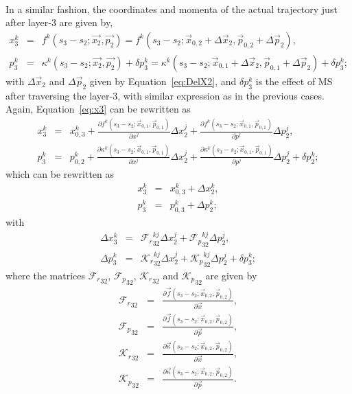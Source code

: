 ~\\
\noindent
In a similar fashion, the coordinates and momenta of the actual trajectory just after layer-3 are given by,
\begin{eqnarray}
  \label{eq:x3}
  x^{k}_{3} &=& f^{k}(s_3 - s_2;\vec{x_2},\vec{p_2}) = f^{k}(s_3 - s_2;\vec{x}_{0,2} + \Delta \vec{x}_{2},\vec{p}_{0,2} + \Delta \vec{p}_{2}), \\
  p^{k}_{3} &=& \kappa^{k}(s_3 - s_2;\vec{x_2},\vec{p_2}) + \delta p^{k}_{3} = \kappa^{k}(s_3 - s_2;\vec{x}_{0,1} + \Delta\vec{x}_{2},\vec{p}_{0,1} + \Delta \vec{p}_{2}) + \delta p^{k}_{3};
\end{eqnarray}
\noindent
with $\Delta \vec{x}_{2}$ and $\Delta \vec{p}_{2}$ given by Equation~\ref{eq:DelX2}, and $\delta p^{k}_{3}$ is the effect of MS after traversing the layer-3, with similar expression as in the 
previous cases. Again, Equation~\ref{eq:x3} can be rewritten as
\begin{eqnarray}
  x^{k}_{3} &=& x^{k}_{0,3}  + \frac{\partial f^{k}(s_3 - s_2;\vec{x}_{0,1},\vec{p}_{0,1})}{\partial x^{j}} \Delta x^{j}_{2} + \frac{\partial f^{k}(s_3 - s_2;\vec{x}_{0,1},\vec{p}_{0,1})}{\partial p^{j}} \Delta p^{j}_{2}, \\
  p^{k}_{3} &=& p^{k}_{0,2}  + \frac{\partial \kappa^{k}(s_3 - s_2;\vec{x}_{0,1},\vec{p}_{0,1})}{\partial x^{j}} \Delta x^{j}_{2} + \frac{\partial \kappa^{k}(s_3 - s_2;\vec{x}_{0,1},\vec{p}_{0,1})}{\partial p^{j}} \Delta p^{j}_{2} + \delta p^{k}_{2};
\end{eqnarray}
\noindent
which can be rewritten as
\begin{eqnarray}
  x^{k}_{3} &=& x^{k}_{0,3} + \Delta x^{k}_{2}, \\
  p^{k}_{3} &=& p^{k}_{0,3} + \Delta p^{k}_{2};
\end{eqnarray}
\noindent
with 
\begin{eqnarray}
  \label{eq:DelX3}
  \Delta x^{k}_{3} &=& {\mathcal F_{r}}^{kj}_{32} \Delta x^{j}_{2} + {\mathcal F_{p}}^{kj}_{32} \Delta p^{j}_{2}, \\
  \Delta p^{k}_{3} &=& {\mathcal K_{r}}^{kj}_{32} \Delta x^{j}_{2} + {\mathcal K_{p}}^{kj}_{32} \Delta p^{j}_{2}  + \delta p^{k}_{3};
\end{eqnarray}
\noindent
where the matrices ${\mathcal F_{r}}_{32}$, ${\mathcal F_{p}}_{32}$, ${\mathcal K_{r}}_{32}$ and ${\mathcal K_{p}}_{32}$ are given by
\begin{eqnarray}
  {\mathcal F_{r}}_{32} &=& \frac{\partial \vec{f}(s_3 - s_2;\vec{x}_{0,2},\vec{p}_{0,2})}{\partial \vec{x}}, \\
  {\mathcal F_{p}}_{32} &=& \frac{\partial \vec{f}(s_3 - s_2;\vec{x}_{0,2},\vec{p}_{0,2})}{\partial \vec{p}}, \\
  {\mathcal K_{r}}_{32} &=& \frac{\partial \vec{\kappa}(s_3 - s_2;\vec{x}_{0,2},\vec{p}_{0,2})}{\partial \vec{x}}, \\
  {\mathcal K_{p}}_{32} &=& \frac{\partial \vec{\kappa}(s_3 - s_2;\vec{x}_{0,2},\vec{p}_{0,2})}{\partial \vec{p}}.
\end{eqnarray}

